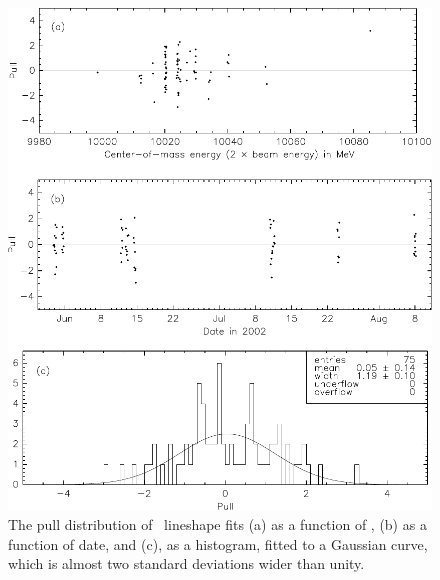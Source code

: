 \documentclass{cornell}
\begin{document}
\begin{figure}[p]
  \begin{center}
    \includegraphics[width=\linewidth]{plots/pullstwo}
  \end{center}
  \caption[Pull distributions for \uss]{\label{pullstwo} The pull distribution of \uss\ lineshape
  fits (a) as a function of \ecm, (b) as a function of date, and (c),
  as a histogram, fitted to a Gaussian curve, which is almost two
  standard deviations wider than unity.}
\end{figure}
\end{document}

